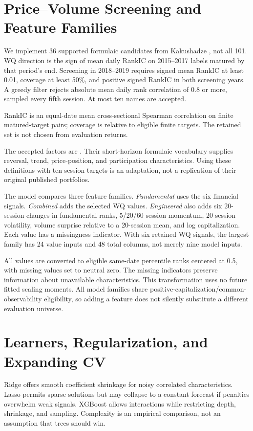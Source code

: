 \documentclass[11pt]{article}
\newcommand{\nbtable}[3]{\begin{table}[H]\centering\caption{#2}\label{tab:#1}\small\sbox{\tablebox}{}\ifdim\wd\tablebox>\linewidth\resizebox{\linewidth}{!}{\usebox{\tablebox}}\else\usebox{\tablebox}\fi\par\vspace{3pt}\begin{minipage}{\textwidth}\footnotesize #3\end{minipage}\end{table}}
\begin{document}
\section{Price--Volume Screening and Feature Families}
We implement 36 supported formulaic candidates from Kakushadze \cite{wq}, not all 101. WQ direction is the sign of mean daily RankIC on 2015--2017 labels matured by that period's end. Screening in 2018--2019 requires signed mean RankIC at least 0.01, coverage at least 50\%, and positive signed RankIC in both screening years. A greedy filter rejects absolute mean daily rank correlation of 0.8 or more, sampled every fifth session. At most ten names are accepted.
\nbtable{nb_wq}{WQ signals retained by the fresh screening run.}{RankIC is an equal-date mean cross-sectional Spearman correlation on finite matured-target pairs; coverage is relative to eligible finite targets. The retained set is not chosen from evaluation returns.}

The accepted factors are \WQList{}. Their short-horizon formulaic vocabulary supplies reversal, trend, price-position, and participation characteristics. Using these definitions with ten-session targets is an adaptation, not a replication of their original published portfolios.

The model compares three feature families. \emph{Fundamental} uses the six financial signals. \emph{Combined} adds the selected WQ values. \emph{Engineered} also adds six 20-session changes in fundamental ranks, 5/20/60-session momentum, 20-session volatility, volume surprise relative to a 20-session mean, and log capitalization. Each value has a missingness indicator. With six retained WQ signals, the largest family has 24 value inputs and 48 total columns, not merely nine model inputs.

All values are converted to eligible same-date percentile ranks centered at 0.5, with missing values set to neutral zero. The missing indicators preserve information about unavailable characteristics. This transformation uses no future fitted scaling moments. All model families share positive-capitalization/common-observability eligibility, so adding a feature does not silently substitute a different evaluation universe.
\clearpage

\section{Learners, Regularization, and Expanding CV}
Ridge offers smooth coefficient shrinkage for noisy correlated characteristics. Lasso permits sparse solutions but may collapse to a constant forecast if penalties overwhelm weak signals. XGBoost allows interactions while restricting depth, shrinkage, and sampling. Complexity is an empirical comparison, not an assumption that trees should win.
\end{document}
